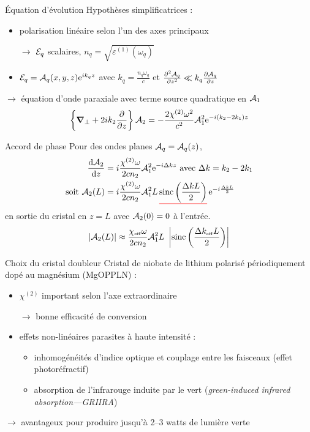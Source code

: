 \documentclass{beamer}
\newcommand{\chie}{\chi_\mathsc{eff}}
\newcommand{\dke}{\Delta k_\mathsc{eff}}
\begin{document}
\begin{frame}{Équation d'évolution}
Hypothèses simplificatrices :
\begin{itemize}
\item polarisation linéaire selon l'un des axes principaux
\item[$\rightarrow$] $\E_q$ scalaires, $n_q = \sqrt{ \varepsilon^{(1)}(\omega_q)}$
\item $\E_q = \A_q(x,y,z) \e{ik_qz}$ avec $k_q =\frac{n_q \omega_q}{c}$ et $\frac{\partial^2 \A_q}{\partial z^2} \ll k_q \frac{\partial \A_q}{\partial z}$
\end{itemize}
$\boldsymbol \rightarrow$ équation d'onde paraxiale avec terme source quadratique en $\A_1$
\begin{equation*}
\left\{\v\nabla_\bot + 2 i k_2 \frac{\partial}{\partial z} \right\} \A_2 = - \frac{2 \chi^{(2)} \omega^2}{c^2} \A_1^2 \e{- i (k_2 - 2k_1) z}
\end{equation*}
\end{frame}

\begin{frame}{Accord de phase}
Pour des ondes planes $\A_q = \A_q(z)$,
\begin{align*}
	\dv{\A_2}{z} &= i\frac{\chi^{(2)}\omega}{2cn_2} \A_1^2 \e{-i \Delta k z} \text{ avec } {\Delta k = k_2 - 2k_1} \label{eq:pwe} \\
	\text{soit } \A_2(L) &= i \frac{\chi^{(2)}\omega}{2 cn_2} \A_1^2 L\, \uline{red}{\operatorname{sinc}\left( \frac{\Delta k L}{2} \right)}\, \e{-i\frac{\Delta k L}{2}}
\end{align*}
en sortie du cristal en $z=L$ avec $\A_2(0)=0$ à l'entrée.
\begin{align*}
\left|\A_2(L)\right| \approx \frac{\chie\omega}{2 cn_2} \A_1^2 L\ \left|\operatorname{sinc}\left( \frac{\dke L}{2} \right)\right|
\end{align*}
\end{frame}

\begin{frame}{Choix du cristal doubleur}
Cristal de niobate de lithium polarisé périodiquement dopé au magnésium (MgO\hc PPLN) :
\begin{itemize}
\item $\chi^{(2)}$ important selon l'axe extraordinaire
\item[$\rightarrow$] bonne efficacité de conversion
\item effets non-linéaires parasites à haute intensité :
\begin{itemize}
\item inhomogénéités d'indice optique et couplage entre les faisceaux (effet photoréfractif)
\item absorption de l'infrarouge induite par le vert (\textit{green-induced infrared absorption---GRIIRA})
\end{itemize}
\end{itemize}
$\boldsymbol\rightarrow$ avantageux pour produire jusqu'à 2--3 watts de lumière verte
\end{frame}
\end{document}
